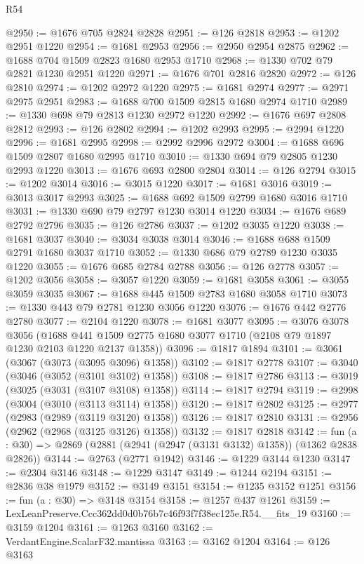 \begin{lexlean}{R54}
\begin{coremodule}
@2950 := @1676 @705 @2824 @2828
@2951 := @126 @2818
@2953 := @1202 @2951 @1220
@2954 := @1681 @2953
@2956 := @2950 @2954 @2875
@2962 := @1688 @704 @1509 @2823 @1680 @2953 @1710
@2968 := @1330 @702 @79 @2821 @1230 @2951 @1220
@2971 := @1676 @701 @2816 @2820
@2972 := @126 @2810
@2974 := @1202 @2972 @1220
@2975 := @1681 @2974
@2977 := @2971 @2975 @2951
@2983 := @1688 @700 @1509 @2815 @1680 @2974 @1710
@2989 := @1330 @698 @79 @2813 @1230 @2972 @1220
@2992 := @1676 @697 @2808 @2812
@2993 := @126 @2802
@2994 := @1202 @2993
@2995 := @2994 @1220
@2996 := @1681 @2995
@2998 := @2992 @2996 @2972
@3004 := @1688 @696 @1509 @2807 @1680 @2995 @1710
@3010 := @1330 @694 @79 @2805 @1230 @2993 @1220
@3013 := @1676 @693 @2800 @2804
@3014 := @126 @2794
@3015 := @1202 @3014
@3016 := @3015 @1220
@3017 := @1681 @3016
@3019 := @3013 @3017 @2993
@3025 := @1688 @692 @1509 @2799 @1680 @3016 @1710
@3031 := @1330 @690 @79 @2797 @1230 @3014 @1220
@3034 := @1676 @689 @2792 @2796
@3035 := @126 @2786
@3037 := @1202 @3035 @1220
@3038 := @1681 @3037
@3040 := @3034 @3038 @3014
@3046 := @1688 @688 @1509 @2791 @1680 @3037 @1710
@3052 := @1330 @686 @79 @2789 @1230 @3035 @1220
@3055 := @1676 @685 @2784 @2788
@3056 := @126 @2778
@3057 := @1202 @3056
@3058 := @3057 @1220
@3059 := @1681 @3058
@3061 := @3055 @3059 @3035
@3067 := @1688 @445 @1509 @2783 @1680 @3058 @1710
@3073 := @1330 @443 @79 @2781 @1230 @3056 @1220
@3076 := @1676 @442 @2776 @2780
@3077 := @2104 @1220
@3078 := @1681 @3077
@3095 := @3076
    @3078
    @3056
    (@1688 @441 @1509 @2775 @1680 @3077 @1710 (@2108 @79 @1897 @1230 @2103 @1220 @2137 @1358))
@3096 := @1817 @1894
@3101 := @3061 (@3067 (@3073 (@3095 @3096) @1358))
@3102 := @1817 @2778
@3107 := @3040 (@3046 (@3052 (@3101 @3102) @1358))
@3108 := @1817 @2786
@3113 := @3019 (@3025 (@3031 (@3107 @3108) @1358))
@3114 := @1817 @2794
@3119 := @2998 (@3004 (@3010 (@3113 @3114) @1358))
@3120 := @1817 @2802
@3125 := @2977 (@2983 (@2989 (@3119 @3120) @1358))
@3126 := @1817 @2810
@3131 := @2956 (@2962 (@2968 (@3125 @3126) @1358))
@3132 := @1817 @2818
@3142 := fun (a : @30) => @2869 (@2881 (@2941 (@2947 (@3131 @3132) @1358)) (@1362 @2838 @2826))
@3144 := @2763 (@2771 @1942)
@3146 := @1229 @3144 @1230
@3147 := @2304 @3146
@3148 := @1229 @3147
@3149 := @1244 @2194
@3151 := @2836 @38 @1979
@3152 := @3149 @3151
@3154 := @1235 @3152 @1251
@3156 := fun (a : @30) => @3148 @3154
@3158 := @1257 @437 @1261
@3159 := LexLeanPreserve.Ccc362dd0d0b76b7c46f93f7f38ec125e.R54.__fits_19
@3160 := @3159 @1204
@3161 := @1263 @3160
@3162 := VerdantEngine.ScalarF32.mantissa
@3163 := @3162 @1204
@3164 := @126 @3163

\end{coremodule}
\end{lexlean}
